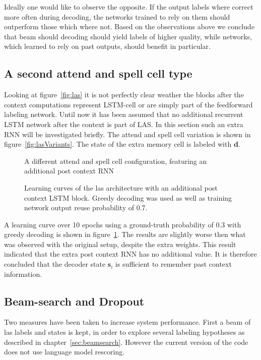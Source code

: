 Ideally one would like to observe the opposite. If the output labels where correct more often during decoding, the networks trained to rely on them should outperform those which where not. Based on the observations above we conclude that beam should decoding should yield labels of higher quality, while networks, which learned to rely on past outputs, should benefit in particular.


\subsection{A second attend and spell cell type}
Looking at figure~\ref{fig:las} it is not perfectly clear weather the blocks after the context computations represent LSTM-cell or are simply part of the feedforward labeling network. Until now it has been assumed that no additional recurrent LSTM network after the context is part of LAS. In this section such an extra RNN will be investigated briefly. The attend and spell cell variation is shown in figure~\ref{fig:lasVariants}. The state of the extra memory cell is labeled with $\mathbf{d}$.
\begin{figure}
\centering

\caption{A different attend and spell cell configuration, featuring an additional post context RNN}
\label{fig:lasVariants}


\caption{Learning curves of the las architecture with an additional post context LSTM block. Greedy decoding was used as well as training network output reuse probability of 0.7.}
\label{fig:variantResult}
\end{figure}
A learning curve over 10 epochs using a ground-truth probability of 0.3 with greedy decoding is shown in figure~\ref{fig:variantResult}. The results are slightly worse then what was observed with the original setup, despite the extra weights. This result indicated that the extra post context RNN has no additional value.
It is therefore concluded that the decoder state $\mathbf{s}_i$ is sufficient to remember past context information.

\subsection{Beam-search and Dropout}
Two measures have been taken to increase system performance. First a beam of las labels and states is kept, in order to explore several labeling hypotheses as described in chapter~\ref{sec:beamsearch}. However the current version of the code does not use language model rescoring.

